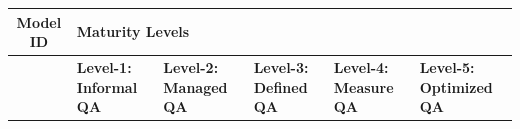\documentclass[a4paper,oneside]{bth}
\begin{document}
\begin{longtable}[h]{|c|p{1.5cm}|p{2cm}|p{2.2cm}|p{2.2cm}|p{2cm}|}
\hline
\centering

\textbf{Model ID} & \multicolumn{5}{l|}{\textbf{Maturity Levels}}                                                                                                                                                                                                                                                                                                                                                                                                                                                                                                                                                                                                                                                         \\ \hline
                  & \textbf{Level-1: Informal QA} & \textbf{Level-2: Managed QA}                                                                                                                                                             & \textbf{Level-3: Defined QA}                                                                                                                                                                                                       & \textbf{Level-4: Measure QA}                                                                                                                        & \textbf{Level-5: Optimized QA}                                                  \\ \hline

\end{longtable}
\end{document}
